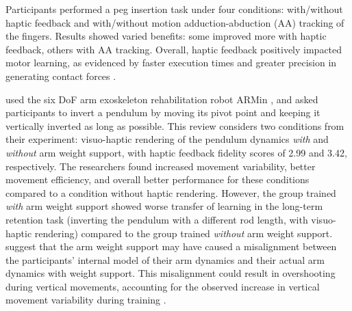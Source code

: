Participants performed a peg insertion task under four conditions: with/without haptic feedback and with/without motion adduction-abduction (AA) tracking of the fingers. Results showed varied benefits: some improved more with haptic feedback, others with AA tracking. Overall, haptic feedback positively impacted motor learning, as evidenced by faster execution times and greater precision in generating contact forces \cite{LeeY2019}.


\cite{Oezen2022} used the six DoF arm exoskeleton rehabilitation robot ARMin \cite{Just2018ExoskeletonObserver}, and asked participants to invert a pendulum by moving its pivot point and keeping it vertically inverted as long as possible. This review considers two conditions from their experiment: visuo-haptic rendering of the pendulum dynamics \textit{with} and \textit{without} arm weight support, with haptic feedback fidelity scores of 2.99 and 3.42, respectively. The researchers found increased movement variability, better movement efficiency, and overall better performance for these conditions compared to a condition without haptic rendering. However, the group trained \textit{with} arm weight support showed worse transfer of learning in the long-term retention task (inverting the pendulum with a different rod length, with visuo-haptic rendering) compared to the group trained \textit{without} arm weight support. \cite{Oezen2022} suggest that the arm weight support may have caused a misalignment between the participants' internal model of their arm dynamics and their actual arm dynamics with weight support. This misalignment could result in overshooting during vertical movements, accounting for the observed increase in vertical movement variability during training \cite{Oezen2022}.

